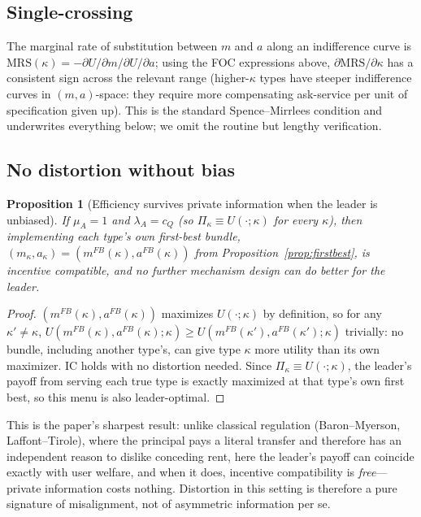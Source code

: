 \documentclass[11pt]{article}
\newtheorem{proposition}{Proposition}
\begin{document}
\subsection{Single-crossing}
The marginal rate of substitution between $m$ and $a$ along an indifference curve
is $\text{MRS}(\kappa) = -\partial U/\partial m \big/ \partial U/\partial a$; using
the FOC expressions above, $\partial \text{MRS}/\partial \kappa$ has a consistent
sign across the relevant range (higher-$\kappa$ types have steeper indifference
curves in $(m,a)$-space: they require more compensating ask-service per unit of
specification given up). This is the standard Spence--Mirrlees condition and
underwrites everything below; we omit the routine but lengthy verification.

\subsection{No distortion without bias}

\begin{proposition}[Efficiency survives private information when the leader is unbiased]
\label{prop:nodistortion}
If $\mu_A=1$ and $\lambda_A=c_Q$ (so $\Pi_\kappa \equiv U(\cdot;\kappa)$ for every
$\kappa$), then implementing each type's own first-best bundle,
$(m_\kappa,a_\kappa)=(m^{FB}(\kappa),a^{FB}(\kappa))$ from
Proposition~\ref{prop:firstbest}, is incentive compatible, and no further
mechanism design can do better for the leader.
\end{proposition}

\begin{proof}
$(m^{FB}(\kappa),a^{FB}(\kappa))$ maximizes $U(\cdot;\kappa)$ by definition, so for
any $\kappa'\ne\kappa$, $U(m^{FB}(\kappa),a^{FB}(\kappa);\kappa) \ge
U(m^{FB}(\kappa'),a^{FB}(\kappa');\kappa)$ trivially: no bundle, including another
type's, can give type $\kappa$ more utility than its own maximizer. IC holds with
no distortion needed. Since $\Pi_\kappa\equiv U(\cdot;\kappa)$, the leader's payoff
from serving each true type is exactly maximized at that type's own first best, so
this menu is also leader-optimal.
\end{proof}

This is the paper's sharpest result: unlike classical regulation (Baron--Myerson,
Laffont--Tirole), where the principal pays a literal transfer and therefore has an
independent reason to dislike conceding rent, here the leader's payoff can
coincide exactly with user welfare, and when it does, incentive compatibility is
\emph{free}---private information costs nothing. Distortion in this setting is
therefore a pure signature of misalignment, not of asymmetric information per se.
\end{document}
